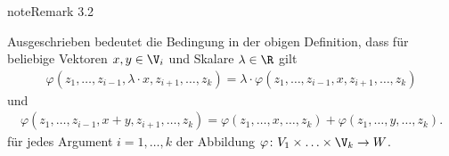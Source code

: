 \documentclass[letterpaper,10pt,german]{jupyterBook}
\begin{document}
\begin{sphinxadmonition}{note}{Remark 3.2}



\sphinxAtStartPar
Ausgeschrieben bedeutet die Bedingung in der obigen Definition, dass für beliebige Vektoren \(x,y\in \V_i\) und Skalare \(\lambda \in \R\) gilt
\begin{equation*}
\begin{split}\varphi(z_1,\ldots,z_{i-1},\lambda \cdot x, z_{i+1},\ldots,z_k) = \lambda \cdot \varphi(z_1,\ldots,z_{i-1}, x, z_{i+1}, \ldots,z_k)\end{split}
\end{equation*}
\sphinxAtStartPar
und
\begin{equation*}
\begin{split}\varphi(z_1,\ldots,z_{i-1},x+y,z_{i+1},\ldots,z_k) = \varphi(z_1,\ldots,x,\ldots,z_k) + \varphi(z_1,\ldots,y,\ldots,z_k).\end{split}
\end{equation*}
\sphinxAtStartPar
für jedes Argument \(i = 1,\ldots,k\) der Abbildung \(\varphi \colon V_1 \times \ldots \times \V_k \rightarrow W\).
\end{sphinxadmonition}
\end{document}
